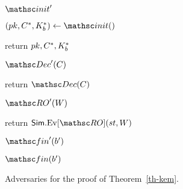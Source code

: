 \begin{figure}[tp]
{	\begin{algorithm-subsequent}{$\Initialize'$}
		\item $(\pk,C^*,K^*_b) \gets \Initialize()$
		\item return $pk,C^*,K^*_b$
	\end{algorithm-subsequent}
	\ExptSepSpace
	
	\begin{algorithm-subsequent}{$\DecO'(C)$}%
		\item return $\DecO(C)$
	\end{algorithm-subsequent}	
	
	\ExptSepSpace	
	
	\begin{algorithm-subsequent}{$\RO'(W)$}
		\item return $\Simeval[\RO](\commoncoins,W)$
	\end{algorithm-subsequent}
	
	\ExptSepSpace
	
	\begin{algorithm-subsequent}{$\Finalize'(b')$}
		\item $\Finalize(b')$\vspace{4pt}
	\end{algorithm-subsequent}

	}
	\caption{Adversaries for the proof of Theorem~\ref{th-kem}.}
	\label{fig-kem-advs}
	\hrulefill
\end{figure}
